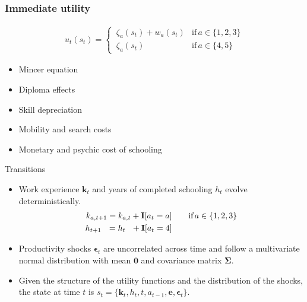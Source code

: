 \begin{frame}\frametitle{Immediate utility}\vspace{0.3cm}

  \begin{multicols}{2}

  \begin{align*}
  u_t(s_t) =
  \begin{cases}
      \,\zeta_a(s_t)  + w_a(s_t)   & \text{if}\, a \in \{1, 2, 3\}  \\[0.2cm]
      \,\zeta_a(s_t)                 &  \text{if}\, a \in \{4, 5\}
  \end{cases}
  \end{align*}

  \columnbreak


  \vspace{0.3cm}
  \begin{itemize}\setlength\itemsep{1em}
     \item Mincer equation
     \item Diploma effects
     \item Skill depreciation
     \item Mobility and search costs
     \item Monetary and psychic cost of schooling
  \end{itemize}

\end{multicols}

\end{frame}
\begin{frame}{Transitions}\vspace{0.25cm}

\begin{itemize}\setlength\itemsep{1em}
  \item Work experience $\bm{k}_t$  and years of completed schooling $h_t$ evolve deterministically.
  \begin{align*}
  k_{a,t+1} = k_{a,t} + {\textbf{I}}[a_t = a]  &\qquad \text{if}\, a \in \{1, 2, 3\} \\
  h_{t + 1\phantom{,a}} = h_{t\phantom{,a}} +   {\textbf{I}}[a_t = 4]  &\qquad
  \end{align*}


  \item Productivity shocks $\bm{\epsilon}_t$ are uncorrelated across time and follow a multivariate normal distribution with mean $\bm{0}$ and covariance matrix $\bm{\Sigma}$.

  \item Given the structure of the utility functions and the distribution of the shocks, the state at time $t$ is $s_t = \{\bm{k}_t, h_t, t, a_{t -1}, \bm{e},\bm{\epsilon}_t\}$.
\end{itemize}

\end{frame}
